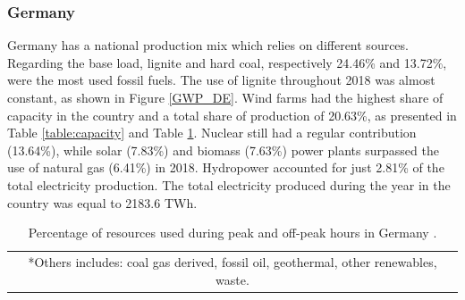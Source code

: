 {\subsubsection{Germany}
Germany has a national production mix which relies on different sources. Regarding the base load, lignite and hard coal, {respectively 24.46\% and 13.72\%,} were the most used fossil fuels. The use of lignite throughout 2018 was almost constant, as shown in Figure \ref{GWP_DE}. Wind farms had the highest share of capacity in the country and a total share of production of 20.63\%, as presented in Table \ref{table:capacity} and Table \ref{RES_DE}. Nuclear still had  a regular contribution {(13.64\%)}, while solar {(7.83\%)} and biomass {(7.63\%)} power plants surpassed the use of natural gas {(6.41\%)} in 2018. Hydropower accounted for just 2.81\% of the total electricity production. The total electricity produced during the year in the country was equal to 2183.6 TWh. 


 \begin{table}[]
\centering
\caption{Percentage of resources used during peak and off-peak hours in Germany \cite{Entso-eProduction}.}
\label{RES_DE}
\begin{tabular}{@{}c@{}} 
\multicolumn{1}{p{\textwidth -.88in}}{\footnotesize {*Others} includes: coal gas derived,  fossil oil, geothermal, other renewables, waste.}
\end{tabular}
\end{table}

\vspace{-8mm}

}
